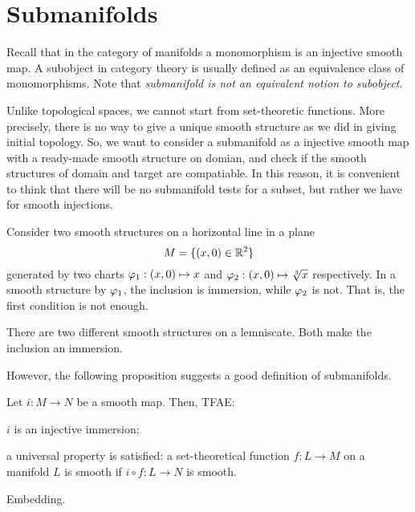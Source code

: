 \documentclass{../note}
\begin{document}
\section{Submanifolds}

Recall that in the category of manifolds a monomorphism is an injective smooth map.
A subobject in category theory is usually defined as an equivalence class of monomorphisms.
Note that \emph{submanifold is not an equivalent notion to subobject}.





Unlike topological spaces, we cannot start from set-theoretic functions.
More precisely, there is no way to give a unique smooth structure as we did in giving initial topology.
So, we want to consider a submanifold as a injective smooth map with a ready-made smooth structure on domian, and check if the smooth structures of domain and target are compatiable.
In this reason, it is convenient to think that there will be no submanifold tests for a subset, but rather we have for smooth injections.
\begin{ex}
Consider two smooth structures on a horizontal line in a plane
\[M=\{(x,0)\in\mathbb{R}^2\}\]
generated by two charts $\varphi_1:(x,0)\mapsto x$ and $\varphi_2:(x,0)\mapsto\sqrt[3]{x}$ respectively.
In a smooth structure by $\varphi_1$, the inclusion is immersion, while $\varphi_2$ is not.
That is, the first condition is not enough.
\end{ex}
\begin{ex}
There are two different smooth structures on a lemniscate.
Both make the inclusion an immersion.
\end{ex}

However, the following proposition suggests a good definition of submanifolds.
\begin{prop}
Let $i:M\to N$ be a smooth map.
Then, TFAE:
\begin{parts}
\item $i$ is an injective immersion;
\item a universal property is satisfied: a set-theoretical function $f:L\to M$ on a manifold $L$ is smooth if $i\circ f:L\to N$ is smooth.
\end{parts}
\end{prop}


Embedding.
\end{document}
